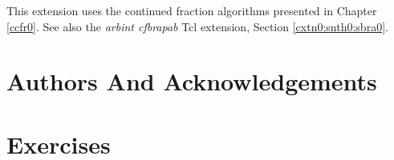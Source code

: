 \begin{dosutilcommandseealso}
This extension uses the continued fraction
algorithms presented in Chapter \ref{ccfr0}.
See also the \emph{arbint cfbrapab} Tcl extension, 
Section \ref{cxtn0:snth0:sbra0}.
\end{dosutilcommandseealso}


\section{Authors And Acknowledgements}


\section{Exercises}


